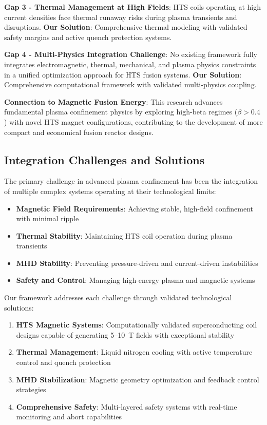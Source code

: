 \documentclass[10pt,twocolumn]{article}
\begin{document}
\textbf{Gap 3 - Thermal Management at High Fields}: HTS coils operating at high current densities face thermal runaway risks during plasma transients and disruptions. \textbf{Our Solution}: Comprehensive thermal modeling with validated safety margins and active quench protection systems.

\textbf{Gap 4 - Multi-Physics Integration Challenge}: No existing framework fully integrates electromagnetic, thermal, mechanical, and plasma physics constraints in a unified optimization approach for HTS fusion systems. \textbf{Our Solution}: Comprehensive computational framework with validated multi-physics coupling.

\textbf{Connection to Magnetic Fusion Energy}: This research advances fundamental plasma confinement physics by exploring high-beta regimes ($\beta > 0.4$) with novel HTS magnet configurations, contributing to the development of more compact and economical fusion reactor designs.

\subsection{Integration Challenges and Solutions}

The primary challenge in advanced plasma confinement has been the integration of multiple complex systems operating at their technological limits:
\begin{itemize}
\item \textbf{Magnetic Field Requirements}: Achieving stable, high-field confinement with minimal ripple
\item \textbf{Thermal Stability}: Maintaining HTS coil operation during plasma transients
\item \textbf{MHD Stability}: Preventing pressure-driven and current-driven instabilities
\item \textbf{Safety and Control}: Managing high-energy plasma and magnetic systems
\end{itemize}

Our framework addresses each challenge through validated technological solutions:
\begin{enumerate}
\item \textbf{HTS Magnetic Systems}: Computationally validated superconducting coil designs capable of generating 5--10~T fields with exceptional stability
\item \textbf{Thermal Management}: Liquid nitrogen cooling with active temperature control and quench protection
\item \textbf{MHD Stabilization}: Magnetic geometry optimization and feedback control strategies
\item \textbf{Comprehensive Safety}: Multi-layered safety systems with real-time monitoring and abort capabilities
\end{enumerate}
\end{document}
